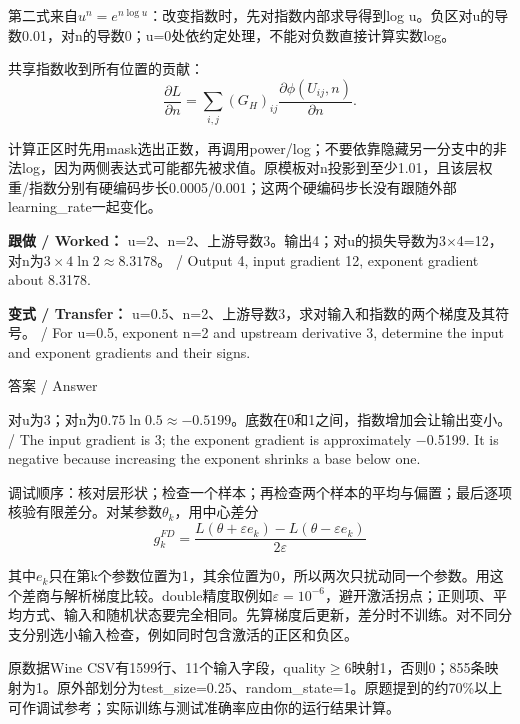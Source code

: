 第二式来自\(u^n=e^{n\log u}\)：改变指数时，先对指数内部求导得到log u。负区对u的导数0.01，对n的导数0；u=0处依约定处理，不能对负数直接计算实数log。


共享指数收到所有位置的贡献：
\[
\frac{\partial L}{\partial n}=\sum_{i,j}(G_H)_{ij}
\frac{\partial\phi(U_{ij},n)}{\partial n}.\tag{A2.5}
\]


计算正区时先用mask选出正数，再调用power/log；不要依靠隐藏另一分支中的非法log，因为两侧表达式可能都先被求值。原模板对n投影到至少1.01，且该层权重/指数分别有硬编码步长0.0005/0.001；这两个硬编码步长没有跟随外部learning\_rate一起变化。


\textbf{跟做 / Worked：} u=2、n=2、上游导数3。输出4；对u的损失导数为3\ensuremath{\times}4=12，对n为\(3\times4\ln2\approx8.3178\)。 / Output 4, input gradient 12, exponent gradient about 8.3178.


\textbf{变式 / Transfer：} u=0.5、n=2、上游导数3，求对输入和指数的两个梯度及其符号。 / For u=0.5, exponent n=2 and upstream derivative 3, determine the input and exponent gradients and their signs.



\begin{StudySolution}{答案 / Answer}


对u为3；对n为\(0.75\ln0.5\approx-0.5199\)。底数在0和1之间，指数增加会让输出变小。 / The input gradient is 3; the exponent gradient is approximately \ensuremath{-}0.5199. It is negative because increasing the exponent shrinks a base below one.


\end{StudySolution}





调试顺序：核对层形状；检查一个样本；再检查两个样本的平均与偏置；最后逐项核验有限差分。对某参数\(\theta_k\)，用中心差分
\[
g_k^{FD}=\frac{L(\theta+\varepsilon e_k)-L(\theta-\varepsilon e_k)}{2\varepsilon}\tag{A2.6}
\]


其中\(e_k\)只在第k个参数位置为1，其余位置为0，所以两次只扰动同一个参数。用这个差商与解析梯度比较。double精度取例如\(\varepsilon=10^{-6}\)，避开激活拐点；正则项、平均方式、输入和随机状态要完全相同。先算梯度后更新，差分时不训练。对不同分支分别选小输入检查，例如同时包含激活的正区和负区。


原数据Wine CSV有1599行、11个输入字段，quality\ensuremath{\ge}6映射1，否则0；855条映射为1。原外部划分为test\_size=0.25、random\_state=1。原题提到的约70\%以上可作调试参考；实际训练与测试准确率应由你的运行结果计算。


